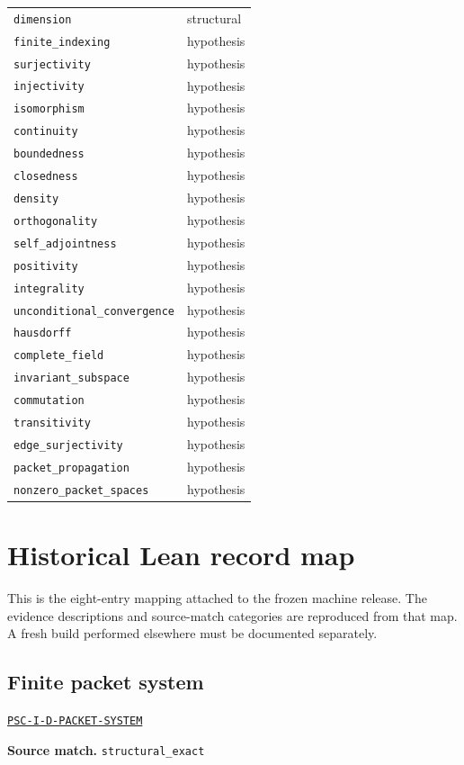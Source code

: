 \documentclass[a4paper,11pt]{article}
\newcommand{\field}[2]{\par\smallskip\noindent\textbf{#1.} #2\par}
\begin{document}
\begin{longtable}{@{}p{}p{}@{}}
\nolinkurl{dimension} & structural\\
\nolinkurl{finite_indexing} & hypothesis\\
\nolinkurl{surjectivity} & hypothesis\\
\nolinkurl{injectivity} & hypothesis\\
\nolinkurl{isomorphism} & hypothesis\\
\nolinkurl{continuity} & hypothesis\\
\nolinkurl{boundedness} & hypothesis\\
\nolinkurl{closedness} & hypothesis\\
\nolinkurl{density} & hypothesis\\
\nolinkurl{orthogonality} & hypothesis\\
\nolinkurl{self_adjointness} & hypothesis\\
\nolinkurl{positivity} & hypothesis\\
\nolinkurl{integrality} & hypothesis\\
\nolinkurl{unconditional_convergence} & hypothesis\\
\nolinkurl{hausdorff} & hypothesis\\
\nolinkurl{complete_field} & hypothesis\\
\nolinkurl{invariant_subspace} & hypothesis\\
\nolinkurl{commutation} & hypothesis\\
\nolinkurl{transitivity} & hypothesis\\
\nolinkurl{edge_surjectivity} & hypothesis\\
\nolinkurl{packet_propagation} & hypothesis\\
\nolinkurl{nonzero_packet_spaces} & hypothesis\\
\bottomrule\end{longtable}\clearpage\section{Historical Lean record map}
This is the eight-entry mapping attached to the frozen machine release. The evidence descriptions and source-match categories are reproduced from that map. A fresh build performed elsewhere must be documented separately.
\subsection*{Finite packet system}
\hyperref[rec:PSC-I-D-PACKET-SYSTEM]{\nolinkurl{PSC-I-D-PACKET-SYSTEM}}
\field{Source match}{\nolinkurl{structural_exact}}
\end{document}
